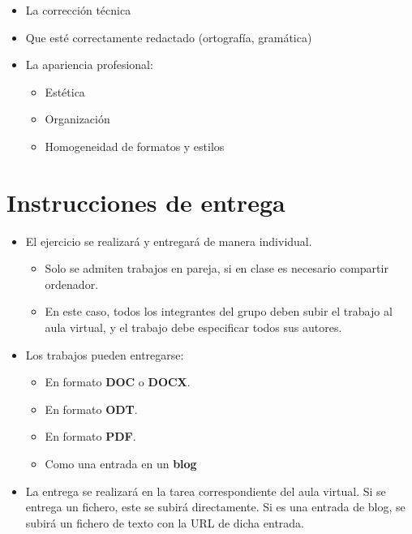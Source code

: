 \begin{itemize}
\item La corrección técnica 
\item Que esté correctamente redactado (ortografía, gramática)
\item La apariencia profesional:
  \begin{itemize}
  \item Estética
  \item Organización
  \item Homogeneidad de formatos y estilos
  \end{itemize}
\end{itemize}

\section{Instrucciones de entrega}
\begin{itemize}
\item El ejercicio se realizará y entregará de manera individual.
  \begin{itemize}
  \item Solo se admiten trabajos en pareja, si en clase es necesario compartir ordenador.
  \item En este caso, todos los integrantes del grupo deben subir el trabajo al aula virtual, y el trabajo debe especificar todos sus autores.
  \end{itemize}

\item Los trabajos pueden entregarse:
  \begin{itemize}
  \item En formato \textbf{DOC} o \textbf{DOCX}.
  \item En formato \textbf{ODT}.
  \item En formato \textbf{PDF}. 
  \item Como una entrada en un \textbf{blog} 

  \end{itemize}
  
\item La entrega se realizará en la tarea correspondiente del aula virtual. Si se entrega un fichero, este se subirá directamente. Si es una entrada de blog, se subirá un fichero de texto con la URL de dicha entrada.
\end{itemize}  






